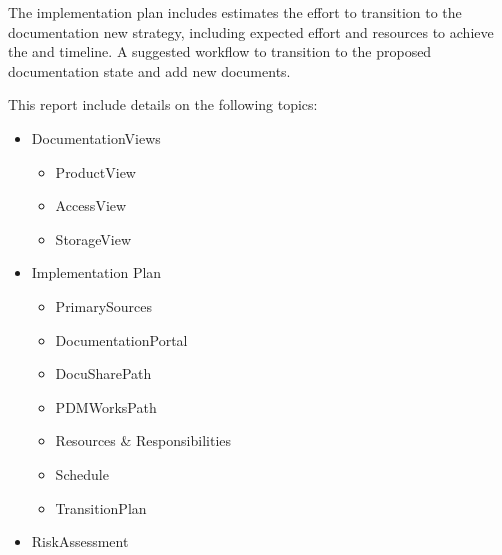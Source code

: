 The implementation plan includes estimates the effort to transition to the documentation new strategy, including expected effort and resources to achieve the and timeline. A suggested workflow to transition to the proposed documentation state and add new documents.

This report include details on the following topics:

\begin{itemize}

\item DocumentationViews
	\begin{itemize}
	\item ProductView
	\item AccessView
	\item  StorageView
	\end{itemize}

\item Implementation Plan
	\begin{itemize}
	\item PrimarySources
	\item DocumentationPortal
	\item DocuSharePath
	\item PDMWorksPath
	\item Resources \& Responsibilities
	\item Schedule
	\item TransitionPlan
	\end{itemize}

\item RiskAssessment

\end{itemize}
